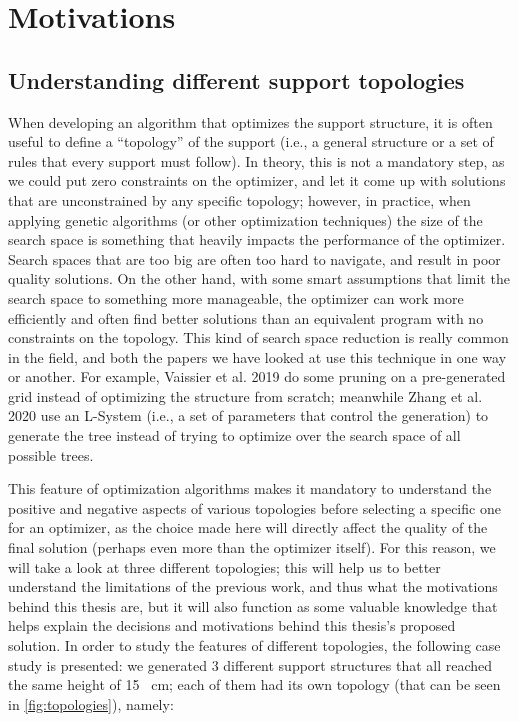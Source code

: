 \chapter{Motivations}
\label{cha:motivations}


\section{Understanding different support topologies}
\label{sec:sup_type}

When developing an algorithm that optimizes the support structure, it is often useful
to define a ``topology'' of the support (i.e., a general structure or a set of rules
that every support must follow). In theory, this is not a mandatory step, as we could
put zero constraints on the optimizer, and let it come up with solutions that are unconstrained
by any specific topology; however, in practice, when applying genetic algorithms (or other optimization techniques)
the size of the search space is something that heavily impacts the performance of the optimizer.
Search spaces that are too big are often too hard to navigate, and result in poor quality solutions.
On the other hand, with some smart assumptions that limit the search space to something more manageable,
the optimizer can work more efficiently and often find better solutions than an equivalent program with
no constraints on the topology.
This kind of search space reduction is really common in the field, and both the papers we have looked at
use this technique in one way or another. For example, Vaissier et al. 2019 \cite{VAISSIER201911}
do some pruning on a pre-generated grid instead of optimizing the structure from scratch; meanwhile
Zhang et al. 2020 \cite{ZHANG2020117} use an L-System (i.e., a set of parameters that control the generation)
to generate the tree instead of trying to optimize over the search space of all possible trees.

This feature of optimization algorithms makes it mandatory to understand the positive and negative aspects
of various topologies before selecting a specific one for an optimizer, as the choice made here will
directly affect the quality of the final solution (perhaps even more than the optimizer itself).
For this reason, we will take a look at three different topologies; this will help us to better
understand the limitations of the previous work, and thus what the motivations behind this thesis are,
but it will also function as some valuable knowledge that helps explain the decisions and motivations
behind this thesis's proposed solution. In order to study the features of different topologies, the
following case study is presented: we generated 3 different support structures that all reached the same height of
15 \SI{}{\centi\metre}; each of them had its own topology (that can be seen in \cref{fig:topologies}), namely:

